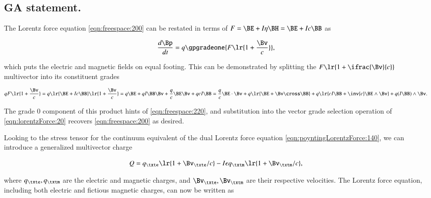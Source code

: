 %
%
\subsection{GA statement.}
The Lorentz force equation \cref{eqn:freespace:200}
can be restated
in terms of \( F = \BE + I \eta \BH = \BE + I c \BB \) as

\begin{dmath}\label{eqn:lorentzForce:20}
\frac{d\Bp}{dt} = q \gpgradeone{ F \lr{ 1 + \frac{\Bv}{c} } },
\end{dmath}

which puts the electric and magnetic fields on equal footing.
This can be demonstrated by splitting the \( F \lr{ 1 + \ifrac{\Bv}{c} } \) multivector into its constituent grades

\begin{dmath}\label{eqn:lorentzForce:40}
q F \lr{ 1 + \frac{\Bv}{c} }
=
q
\lr{ \BE + I c \BB }
\lr{ 1 + \frac{\Bv}{c} }
=
q \BE
+ q I \BB \Bv
+ \frac{q}{c} \BE \Bv
+ q c I \BB
=
  \frac{q}{c} \BE \cdot \Bv
+ q \lr{ \BE + \Bv \cross \BB }
+ q \lr{ c I \BB + \inv{c} \BE \wedge \Bv }
+ q (I \BB) \wedge \Bv.
\end{dmath}

The grade 0 component of this product hints of \cref{eqn:freespace:220}, and substitution into the vector grade selection operation of \cref{eqn:lorentzForce:20} recovers \cref{eqn:freespace:200} as desired.

Looking to the stress tensor for the continuum equivalent of the dual Lorentz force equation \cref{eqn:poyntingLorentzForce:140}, we can introduce a generalized multivector charge

\begin{dmath}\label{eqn:lorentzForce:240}
Q =
q_\txte \lr{ 1 + \Bv_\txte/c }
-I \epsilon q_\txtm \lr{ 1 + \Bv_\txtm/c },
\end{dmath}

where \( q_\txte, q_\txtm \) are the electric and magnetic charges, and \( \Bv_\txte, \Bv_\txtm \) are their respective velocities.
The Lorentz force equation, including both electric and fictious magnetic charges, can now be written as

